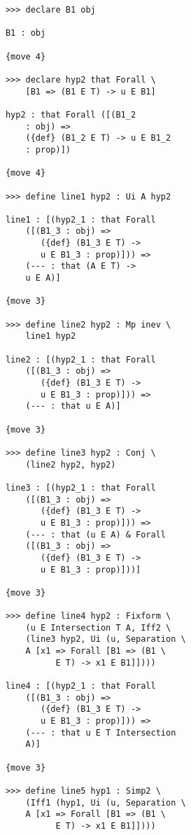 \documentclass[12pt]{article}
\begin{document}
\begin{verbatim}
            >>> declare B1 obj

            B1 : obj

            {move 4}

            >>> declare hyp2 that Forall \
                [B1 => (B1 E T) -> u E B1]

            hyp2 : that Forall ([(B1_2 
                : obj) => 
                ({def} (B1_2 E T) -> u E B1_2 
                : prop)])

            {move 4}

            >>> define line1 hyp2 : Ui A hyp2

            line1 : [(hyp2_1 : that Forall 
                ([(B1_3 : obj) => 
                   ({def} (B1_3 E T) -> 
                   u E B1_3 : prop)])) => 
                (--- : that (A E T) -> 
                u E A)]

            {move 3}

            >>> define line2 hyp2 : Mp inev \
                line1 hyp2

            line2 : [(hyp2_1 : that Forall 
                ([(B1_3 : obj) => 
                   ({def} (B1_3 E T) -> 
                   u E B1_3 : prop)])) => 
                (--- : that u E A)]

            {move 3}

            >>> define line3 hyp2 : Conj \
                (line2 hyp2, hyp2)

            line3 : [(hyp2_1 : that Forall 
                ([(B1_3 : obj) => 
                   ({def} (B1_3 E T) -> 
                   u E B1_3 : prop)])) => 
                (--- : that (u E A) & Forall 
                ([(B1_3 : obj) => 
                   ({def} (B1_3 E T) -> 
                   u E B1_3 : prop)]))]

            {move 3}

            >>> define line4 hyp2 : Fixform \
                (u E Intersection T A, Iff2 \
                (line3 hyp2, Ui (u, Separation \
                A [x1 => Forall [B1 => (B1 \
                      E T) -> x1 E B1]])))

            line4 : [(hyp2_1 : that Forall 
                ([(B1_3 : obj) => 
                   ({def} (B1_3 E T) -> 
                   u E B1_3 : prop)])) => 
                (--- : that u E T Intersection 
                A)]

            {move 3}

            >>> define line5 hyp1 : Simp2 \
                (Iff1 (hyp1, Ui (u, Separation \
                A [x1 => Forall [B1 => (B1 \
                      E T) -> x1 E B1]])))


\end{verbatim}
\end{document}
